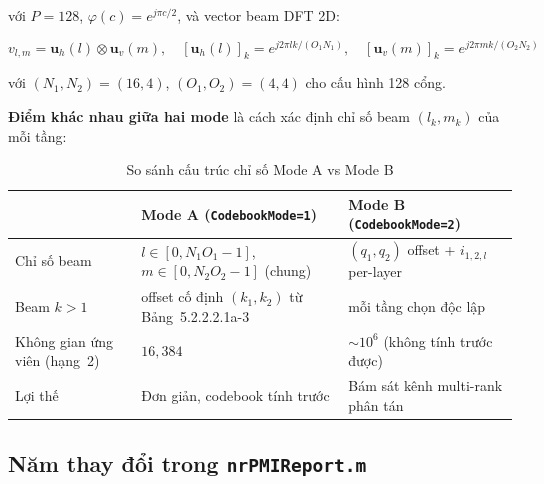 \documentclass[11pt,a4paper]{article}
\begin{document}
với $P=128$, $\varphi(c) = e^{j\pi c/2}$, và vector beam DFT 2D:

\begin{equation}
v_{l,m} = \mathbf{u}_h(l) \otimes \mathbf{u}_v(m), \quad
[\mathbf{u}_h(l)]_k = e^{j2\pi lk/(O_1 N_1)}, \quad
[\mathbf{u}_v(m)]_k = e^{j2\pi mk/(O_2 N_2)}
\end{equation}

với $(N_1,N_2)=(16,4)$, $(O_1,O_2)=(4,4)$ cho cấu hình 128 cổng.

\medskip\noindent\textbf{Điểm khác nhau giữa hai mode} là cách xác định chỉ số
beam $(l_k, m_k)$ của mỗi tầng:

\begin{table}[h!]
\centering
\caption{So sánh cấu trúc chỉ số Mode A vs Mode B}
\label{tab:modeAB_diff}
\begin{tabular}{p{3.5cm}p{5cm}p{5cm}}
\toprule
 & \textbf{Mode A (\texttt{CodebookMode=1})} & \textbf{Mode B (\texttt{CodebookMode=2})} \\
\midrule
Chỉ số beam & $l \in [0,N_1O_1{-}1]$, $m \in [0,N_2O_2{-}1]$ (chung) & $(q_1,q_2)$ offset + $i_{1,2,l}$ per-layer \\
Beam $k>1$ & offset cố định $(k_1,k_2)$ từ Bảng~5.2.2.2.1a-3 & mỗi tầng chọn độc lập \\
Không gian ứng viên (hạng~2) & $16{,}384$ & $\sim 10^6$ (không tính trước được) \\
Lợi thế & Đơn giản, codebook tính trước & Bám sát kênh multi-rank phân tán \\
\bottomrule
\end{tabular}
\end{table}

\subsection{Năm thay đổi trong \texttt{nrPMIReport.m}}
\end{document}
